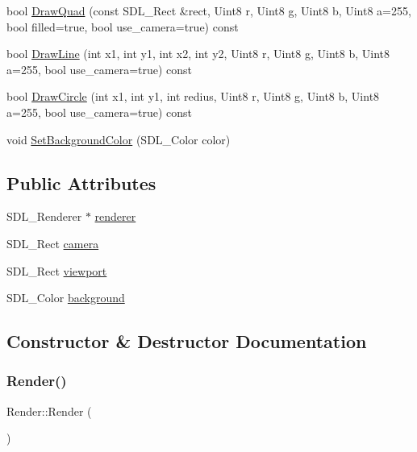 \begin{DoxyCompactItemize}
\item 
bool \mbox{\hyperlink{class_render_a3ee73433ddaacb7325dca11d5a262a18}{Draw\+Quad}} (const S\+D\+L\+\_\+\+Rect \&rect, Uint8 r, Uint8 g, Uint8 b, Uint8 a=255, bool filled=true, bool use\+\_\+camera=true) const
\item 
bool \mbox{\hyperlink{class_render_a4c933fac2d01946be59a70c56eafdba1}{Draw\+Line}} (int x1, int y1, int x2, int y2, Uint8 r, Uint8 g, Uint8 b, Uint8 a=255, bool use\+\_\+camera=true) const
\item 
bool \mbox{\hyperlink{class_render_aa13a90ad9a8cda26ffad5bd0f9a5f2d4}{Draw\+Circle}} (int x1, int y1, int redius, Uint8 r, Uint8 g, Uint8 b, Uint8 a=255, bool use\+\_\+camera=true) const
\item 
void \mbox{\hyperlink{class_render_a48588eec021d31ed31e9f474aa74b1df}{Set\+Background\+Color}} (S\+D\+L\+\_\+\+Color color)
\end{DoxyCompactItemize}
\subsection*{Public Attributes}
\begin{DoxyCompactItemize}
\item 
S\+D\+L\+\_\+\+Renderer $\ast$ \mbox{\hyperlink{class_render_a83fdc275f915ff4a0aa699dd185c30e6}{renderer}}
\item 
S\+D\+L\+\_\+\+Rect \mbox{\hyperlink{class_render_ada982fb8f63e807cdaa68154465edd2a}{camera}}
\item 
S\+D\+L\+\_\+\+Rect \mbox{\hyperlink{class_render_afafe629dbe3f79f8b443df6cb3958f41}{viewport}}
\item 
S\+D\+L\+\_\+\+Color \mbox{\hyperlink{class_render_a14f0d9d0b7ae5afa71f5c4944b21e565}{background}}
\end{DoxyCompactItemize}


\subsection{Constructor \& Destructor Documentation}
\mbox{\label{class_render_a8610cc11739ef679b5935dd819021351}} 
\subsubsection{\texorpdfstring{Render()}{Render()}}
{\footnotesize\ttfamily Render\+::\+Render (\begin{DoxyParamCaption}{ }\end{DoxyParamCaption})}

